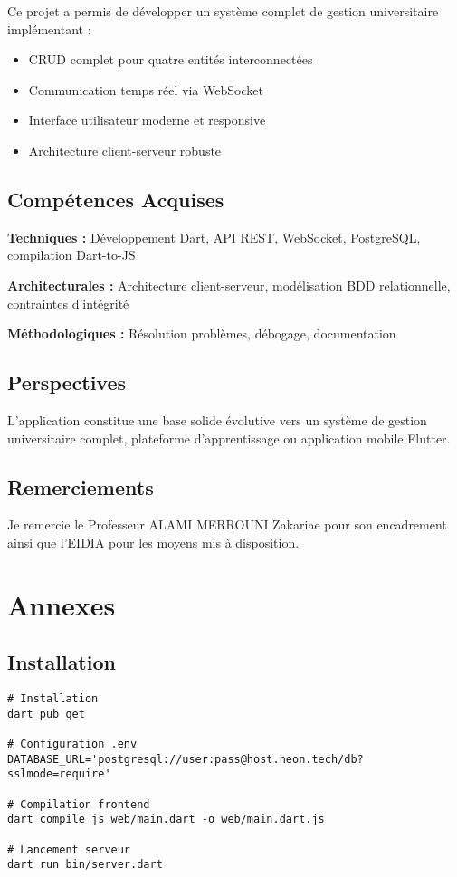 \documentclass{article}
\begin{document}
Ce projet a permis de développer un système complet de gestion universitaire implémentant :

\begin{itemize}
    \item CRUD complet pour quatre entités interconnectées
    \item Communication temps réel via WebSocket
    \item Interface utilisateur moderne et responsive
    \item Architecture client-serveur robuste
\end{itemize}

\subsection{Compétences Acquises}

\textbf{Techniques :} Développement Dart, API REST, WebSocket, PostgreSQL, compilation Dart-to-JS

\textbf{Architecturales :} Architecture client-serveur, modélisation BDD relationnelle, contraintes d'intégrité

\textbf{Méthodologiques :} Résolution problèmes, débogage, documentation

\subsection{Perspectives}

L'application constitue une base solide évolutive vers un système de gestion universitaire complet, plateforme d'apprentissage ou application mobile Flutter.

\subsection{Remerciements}

Je remercie le Professeur ALAMI MERROUNI Zakariae pour son encadrement ainsi que l'EIDIA pour les moyens mis à disposition.

\clearpage
\section{Annexes}

\subsection{Installation}

\begin{lstlisting}[style=dartcode, caption=Installation et lancement]
# Installation
dart pub get

# Configuration .env
DATABASE_URL='postgresql://user:pass@host.neon.tech/db?sslmode=require'

# Compilation frontend
dart compile js web/main.dart -o web/main.dart.js

# Lancement serveur
dart run bin/server.dart
\end{lstlisting}
\end{document}
